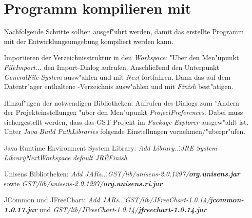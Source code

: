 \chapter{Programm kompilieren mit \eclipse}

Nachfolgende Schritte sollten ausgef"uhrt werden, damit das erstellte Programm mit der Entwicklungsumgebung \eclipse kompiliert werden kann.
\begin{enumerate}
	{%
	\renewcommand{\theenumi}{\arabic{enumi}}
	\renewcommand{\labelenumi}{{\theenumi}.}
	\item Importieren der Verzeichnisstruktur in den \emph{Workspace}:
		  "Uber den Men"upunkt \emph{File\.\chemarrow Import...} den Import-Dialog aufrufen.
		  Anschlie{\ss}end den Unterpunkt \emph{General\.\chemarrow File System} ausw"ahlen und mit \emph{Next} fortfahren.
		  Dann das auf dem Datentr"ager enthaltene \eclipseNS -Verzeichnis ausw"ahlen und mit \emph{Finish} best"atigen.
	\item Hinzuf"ugen der notwendigen Bibliotheken:
		  Aufrufen des Dialogs zum "Andern der Projekteinstellungen "uber den Men"upunkt \emph{Project\.\chemarrow Preferences}.
		  Dabei muss sichergestellt werden, dass das GST-Projekt im \emph{Package Explorer} ausgew"ahlt ist.
		  Unter \emph{Java Build Path\.\chemarrow Libraries} folgende Einstellungen vornehmen/"uberpr"ufen.
		\begin{enumerate}
			{%
			\renewcommand{\theenumii}{\arabic{enumii}}
			\renewcommand{\labelenumii}{{\theenumii}.}
			\item Java Runtime Environment System Library: \emph{Add Library...\.\chemarrow JRE System Library\.\chemarrow Next\.\chemarrow Workspace default JRE\.\chemarrow Finish}
			\item Unisens Bibliotheken: \emph{Add JARs...\.\chemarrow GST/lib/unisens-2.0.1297/\textbf{org.unisens.jar}} sowie \emph{GST/lib/unisens-2.0.1297/\textbf{org.unisens.ri.jar}}
			\item JCommon und JFreeChart: \emph{Add JARs...\.\chemarrow GST/lib/JFreeChart-1.0.14/\textbf{jcommon-1.0.17.jar}} und \emph{GST/lib/JFreeChart-1.0.14/\textbf{jfreechart-1.0.14.jar}}
			}
		\end{enumerate}
	}
\end{enumerate}